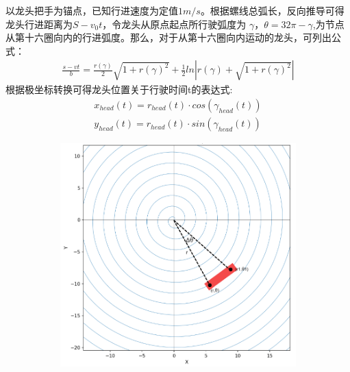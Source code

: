 \documentclass[withoutpreface,bwprint]{cumcmthesis}
\begin{document}
以龙头把手为锚点，已知行进速度为定值$1m/s$。根据螺线总弧长，反向推导可得龙头行进距离为$S-v_0t$，令龙头从原点起点所行驶弧度为
$\gamma$，$\theta = 32\pi - \gamma$,为节点从第十六圈向内的行进弧度。那么，对于从第十六圈向内运动的龙头，可列出公式：
\begin{align*}
	\frac{s-vt}{b} = \frac{r(\gamma)}{2}\sqrt{1+r(\gamma)^2} + \frac{1}{2}ln|r(\gamma)+\sqrt{1+r(\gamma)^2}|
\end{align*}
根据极坐标转换可得龙头位置关于行驶时间t的表达式:
\begin{align*}
	x_{head}(t) = r_{head}(t)\cdot cos(\gamma_{head}(t)) \\
	y_{head}(t) = r_{head}(t)\cdot sin(\gamma_{head}(t)) 
\end{align*}
\begin{figure}[htbp!]
	\centering
	\begin{subfigure}[t]{0.45\textwidth}
		\includegraphics[width=\textwidth]{pics/dts}
		\label{fig:dtd}
	\end{subfigure}
	\hfill
	\begin{subfigure}[t]{0.45\textwidth}

\end{subfigure}
\end{figure}
\end{document}
